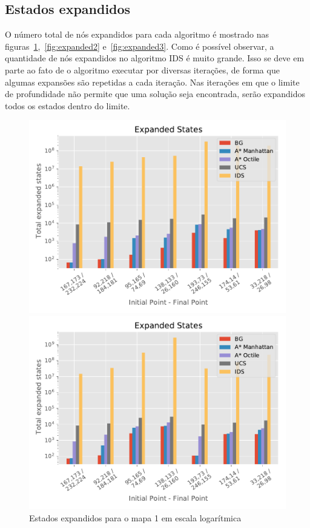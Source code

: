 \subsection{Estados expandidos}
O número total de nós expandidos para cada algoritmo é mostrado nas figuras~\ref{fig:expanded1},~\ref{fig:expanded2} e~\ref{fig:expanded3}. Como é possível observar, a quantidade de nós expandidos no algoritmo IDS é muito grande. Isso se deve em parte ao fato de o algoritmo executar por diversas iterações, de forma que algumas expansões são repetidas a cada iteração. Nas iterações em que o limite de profundidade não permite que uma solução seja encontrada, serão expandidos todos os estados dentro do limite.

\begin{figure}[!htb]
\begin{minipage}{0.5\linewidth}
\centering
\includegraphics[width=\textwidth]{Images/Expanded_States_map1_log.pdf}
\caption{Estados expandidos para o mapa 1 em escala logarítmica}
\label{fig:expanded1}
\end{minipage}%
\begin{minipage}{0.5\linewidth}
\centering
\includegraphics[width=\textwidth]{Images/Expanded_States_map2_log.pdf}

\end{minipage}
\end{figure}
